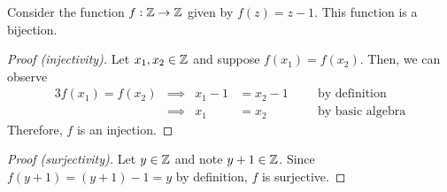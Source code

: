 \begin{example}
    Consider the function $f: \mathbb{Z} \to \mathbb{Z}$ given by $f(z) = z - 1$.
    This function is a bijection.
    \begin{proof}[Proof (injectivity)]
        Let $x_1, x_2 \in \mathbb{Z}$ and suppose $f(x_1) = f(x_2)$.
        Then, we can observe
        \begin{alignat*}{3}
            f(x_1) = f(x_2) &\implies & x_1 - 1 &= x_2 - 1 &~~&\text{ by definition}\\
                            &\implies & x_1 &= x_2 &&\text{ by basic algebra}
        \end{alignat*}
        Therefore, $f$ is an injection.
    \end{proof}
    \begin{proof}[Proof (surjectivity)]
        Let $y \in \mathbb{Z}$ and note $y + 1 \in \mathbb{Z}$.
        Since $f(y + 1) = (y + 1) - 1 = y$ by definition, $f$ is surjective.
    \end{proof}
\end{example}


